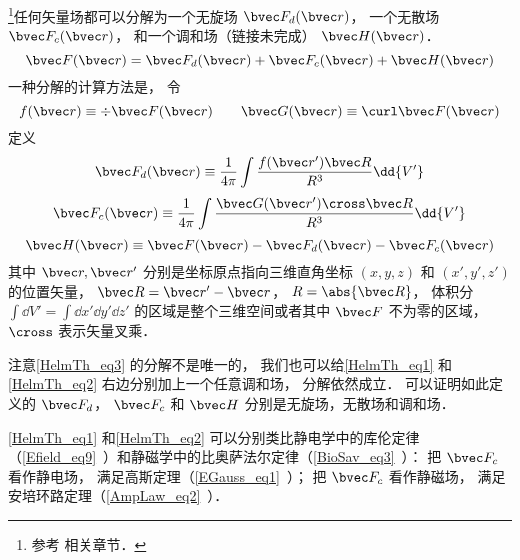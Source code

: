 
\begin{issues}
\issueTODO
\end{issues}


\footnote{参考 \cite{GriffE} 相关章节．}任何矢量场都可以分解为一个无旋场 $\bvec F_{d}(\bvec r)$， 一个无散场 $\bvec F_{c}(\bvec r)$， 和一个调和场（链接未完成） $\bvec H(\bvec r)$．
\begin{equation}\label{HelmTh_eq3}
\bvec F(\bvec r) = \bvec F_{d}(\bvec r) + \bvec F_{c}(\bvec r) + \bvec H(\bvec r)
\end{equation}
一种分解的计算方法是， 令
\begin{equation}
f(\bvec r) \equiv \div \bvec F(\bvec r) \qquad
\bvec G(\bvec r) \equiv \curl \bvec F(\bvec r)
\end{equation}
定义
\begin{equation}\label{HelmTh_eq1}
\bvec F_{d}(\bvec r) \equiv \frac{1}{4\pi}\int \frac{f(\bvec r') \bvec R}{R^3} \dd{V'}
\end{equation}
\begin{equation}\label{HelmTh_eq2}
\bvec F_{c}(\bvec r) \equiv \frac{1}{4\pi}\int \frac{\bvec G(\bvec r')\cross \bvec R}{R^3} \dd{V'}
\end{equation}
\begin{equation}\label{HelmTh_eq4}
\bvec H(\bvec r) \equiv \bvec F(\bvec r) - \bvec F_{d}(\bvec r) - \bvec F_{c}(\bvec r)
\end{equation}
其中 $\bvec r, \bvec r'$ 分别是坐标原点指向三维直角坐标 $(x, y, z)$ 和 $(x', y', z')$ 的位置矢量， $\bvec R = \bvec r' - \bvec r$， $R = \abs{\bvec R}$， 体积分 $\int\dd{V'} = \int\dd{x'}\dd{y'}\dd{z'}$ 的区域是整个三维空间或者其中 $\bvec F$ 不为零的区域， $\cross$ 表示矢量叉乘．

注意\autoref{HelmTh_eq3} 的分解不是唯一的， 我们也可以给\autoref{HelmTh_eq1} 和\autoref{HelmTh_eq2} 右边分别加上一个任意调和场， 分解依然成立． 可以证明如此定义的 $\bvec F_{d}$， $\bvec F_{c}$ 和 $\bvec H$ 分别是无旋场，无散场和调和场．

\autoref{HelmTh_eq1} 和\autoref{HelmTh_eq2} 可以分别类比静电学中的库伦定律（\autoref{Efield_eq9}~）和静磁学中的比奥萨法尔定律（\autoref{BioSav_eq3}~）： 把 $\bvec F_c$ 看作静电场， 满足高斯定理（\autoref{EGauss_eq1}~）； 把 $\bvec F_c$ 看作静磁场， 满足安培环路定理（\autoref{AmpLaw_eq2}~）．

